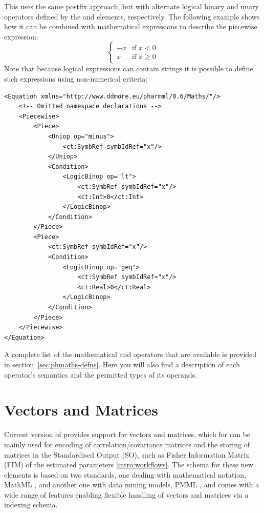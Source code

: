 This uses the same postfix approach, but with alternate logical binary
and unary operators defined by the  and
 elements, respectively. The following example shows
how it can be combined with mathematical expressions to describe the
piecewise expression:
%
\[
\begin{cases}
-x & \text{if } x < 0\\
 x & \text{if } x \geq 0
\end{cases}
\]
%
Note that because logical expressions can contain strings it is
possible to define such expressions using non-numerical criteria:
%
\lstset{language=XML}
\begin{lstlisting}
<Equation xmlns="http://www.ddmore.eu/pharmml/0.6/Maths/"/>
    <!-- Omitted namespace declarations -->
    <Piecewise>
        <Piece>
            <Uniop op="minus">
                <ct:SymbRef symbIdRef="x"/>
            </Uniop>
            <Condition>
                <LogicBinop op="lt">
                    <ct:SymbRef symbIdRef="x"/>
                    <ct:Int>0</ct:Int>
                </LogicBinop>
            </Condition>
        </Piece>
        <Piece>
            <ct:SymbRef symbIdRef="x"/>
            <Condition>
                <LogicBinop op="geq">
                    <ct:SymbRef symbIdRef="x"/>
                    <ct:Real>0</ct:Real>
                </LogicBinop>
            </Condition>
        </Piece>
    </Piecewise>
</Equation>
\end{lstlisting}
%
A complete list of the mathematical and operators that are available
is provided in section~\ref{sec:phmaths-defns}.  Here you will also
find a description of each operator's semantics and the permitted types
of its operands.

\section{Vectors and Matrices}
\label{sec:vectorsAndMatrices}
Current version of \pharmml provides support for vectors and matrices, which for 
can be mainly used for encoding of correlation/covariance matrices and the storing of
matrices in the Standardised Output (SO), such as Fisher Information Matrix (FIM)
of the estimated parameters \ref{intro:workflows}.
The schema for these new elements is based on two standards, one dealing with 
mathematical notation, MathML \cite{mathml3:2010}, 
and another one with data mining models, PMML \cite{pmml:2014}, and comes with 
a wide range of features enabling flexible handling of vectors and matrices via a 
indexing schema.

